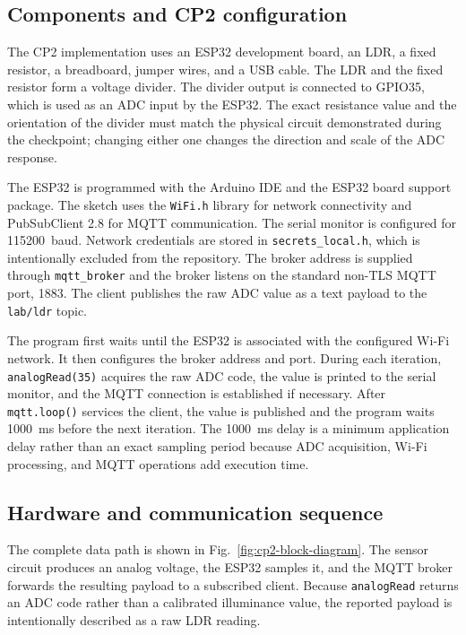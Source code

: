 \subsection{Components and CP2 configuration}
The CP2 implementation uses an ESP32 development board, an LDR, a fixed
resistor, a breadboard, jumper wires, and a USB cable. The LDR and the
fixed resistor form a voltage divider. The divider output is connected to
GPIO35, which is used as an ADC input by the ESP32. The exact resistance
value and the orientation of the divider must match the physical circuit
demonstrated during the checkpoint; changing either one changes the
direction and scale of the ADC response.

The ESP32 is programmed with the Arduino IDE and the ESP32 board support
package. The sketch uses the \texttt{WiFi.h} library for network
connectivity and PubSubClient 2.8 for MQTT communication. The serial
monitor is configured for 115200~baud. Network credentials are stored in
\texttt{secrets\_local.h}, which is intentionally excluded from the
repository. The broker address is supplied through \texttt{mqtt\_broker}
and the broker listens on the standard non-TLS MQTT port, 1883. The
client publishes the raw ADC value as a text payload to the
\texttt{lab/ldr} topic.

The program first waits until the ESP32 is associated with the configured
Wi-Fi network. It then configures the broker address and port. During each
iteration, \texttt{analogRead(35)} acquires the raw ADC code, the value is
printed to the serial monitor, and the MQTT connection is established if
necessary. After \texttt{mqtt.loop()} services the client, the value is
published and the program waits 1000~ms before the next iteration. The
1000~ms delay is a minimum application delay rather than an exact sampling
period because ADC acquisition, Wi-Fi processing, and MQTT operations add
execution time.

\subsection{Hardware and communication sequence}
The complete data path is shown in Fig.~\ref{fig:cp2-block-diagram}.
The sensor circuit produces an analog voltage, the ESP32 samples it,
and the MQTT broker forwards the resulting payload to a subscribed
client. Because \texttt{analogRead} returns an ADC code rather than a
calibrated illuminance value, the reported payload is intentionally
described as a raw LDR reading.

